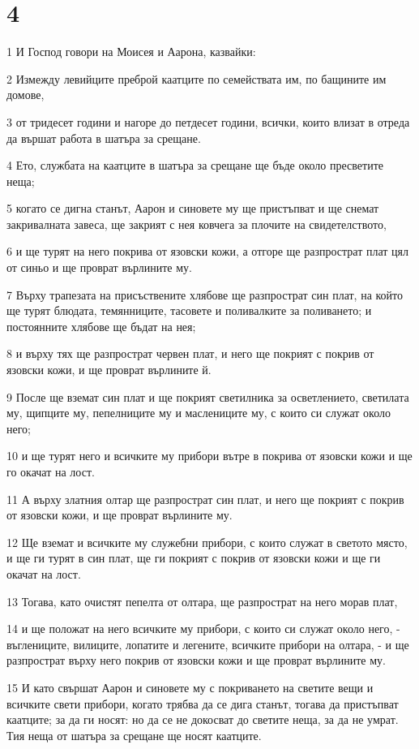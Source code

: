 \chapter{4}

\par 1 И Господ говори на Моисея и Аарона, казвайки:
\par 2 Измежду левийците преброй каатците по семействата им, по бащините им домове,
\par 3 от тридесет години и нагоре до петдесет години, всички, които влизат в отреда да вършат работа в шатъра за срещане.
\par 4 Ето, службата на каатците в шатъра за срещане ще бъде около пресветите неща;
\par 5 когато се дигна станът, Аарон и синовете му ще пристъпват и ще снемат закривалната завеса, ще закрият с нея ковчега за плочите на свидетелството,
\par 6 и ще турят на него покрива от язовски кожи, а отгоре ще разпрострат плат цял от синьо и ще проврат върлините му.
\par 7 Върху трапезата на присъствените хлябове ще разпрострат син плат, на който ще турят блюдата, темянниците, тасовете и поливалките за поливането; и постоянните хлябове ще бъдат на нея;
\par 8 и върху тях ще разпрострат червен плат, и него ще покрият с покрив от язовски кожи, и ще проврат върлините й.
\par 9 После ще вземат син плат и ще покрият светилника за осветлението, светилата му, щипците му, пепелниците му и маслениците му, с които си служат около него;
\par 10 и ще турят него и всичките му прибори вътре в покрива от язовски кожи и ще го окачат на лост.
\par 11 А върху златния олтар ще разпрострат син плат, и него ще покрият с покрив от язовски кожи, и ще проврат върлините му.
\par 12 Ще вземат и всичките му служебни прибори, с които служат в светото място, и ще ги турят в син плат, ще ги покрият с покрив от язовски кожи и ще ги окачат на лост.
\par 13 Тогава, като очистят пепелта от олтара, ще разпрострат на него морав плат,
\par 14 и ще положат на него всичките му прибори, с които си служат около него, - въглениците, вилиците, лопатите и легените, всичките прибори на олтара, - и ще разпрострат върху него покрив от язовски кожи и ще проврат върлините му.
\par 15 И като свършат Аарон и синовете му с покриването на светите вещи и всичките свети прибори, когато трябва да се дига станът, тогава да пристъпват каатците; за да ги носят: но да се не докосват до светите неща, за да не умрат. Тия неща от шатъра за срещане ще носят каатците.
